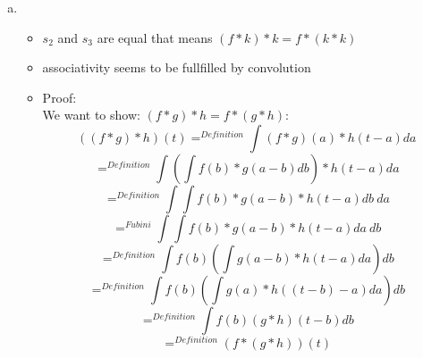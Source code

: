 \documentclass[12pt]{article}
\begin{document}
\begin{enumerate}[a)]
\item 
\begin{itemize}
	\item $s_2$ and $s_3$ are equal that means $(f*k)*k=f*(k*k)$
	\item associativity seems to be fullfilled by convolution
	\item Proof:\\
	We want to show: $(f*g)*h=f*(g*h)$:\\
	$$((f*g)*h)(t) =^{Definition} \int (f*g)(a)*h(t-a) da $$
	$$ =^{Definition} \int (\int f(b)*g(a-b) db)*h(t-a) da $$
	$$=^{Definition}\int \int f(b)*g(a-b)*h(t-a) db~ da $$
	$$=^{Fubini} \int \int f(b)*g(a-b)*h(t-a) da~ db$$
	$$=^{Definition} \int f(b) (\int g(a-b)*h(t-a) da) db$$
	$$=^{Definition} \int f(b)(\int g(a) * h((t-b)-a) da) db $$
	$$=^{Definition} \int f(b) (g*h)(t-b) db$$
	$$=^{Definition} (f*(g*h))(t) $$
\end{itemize}
\end{enumerate}
\end{document}
